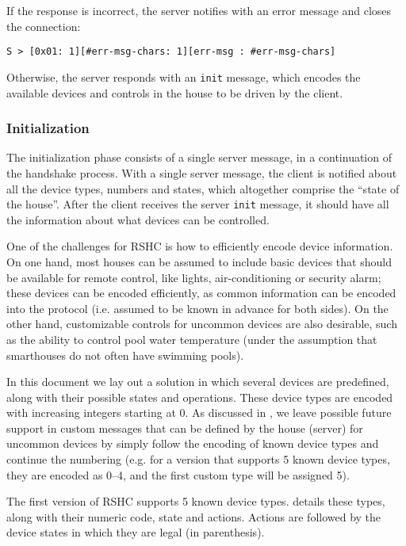\noindent
If the response is incorrect, the server notifies with an error message and closes the connection:
\begin{verbatim}
S > [0x01: 1][#err-msg-chars: 1][err-msg : #err-msg-chars]
\end{verbatim}

\noindent
Otherwise, the server responds with an {\tt init} message, which encodes the available devices and controls in the house to be driven by the client.

\subsubsection{Initialization}
\label{sec:pdus:pdu:init}

The initialization phase consists of a single server message, in a continuation of the handshake process. With a single server message, the client is notified about all the device types, numbers and states, which altogether comprise the ``state of the house''. After the client receives the server {\tt init} message, it should have all the information about what devices can be controlled.

One of the challenges for RSHC is how to efficiently encode device information. On one hand, most houses can be assumed to include basic devices that should be available for remote control, like lights, air-conditioning or security alarm; these devices can be encoded efficiently, as common information can be encoded into the protocol (i.e. assumed to be known in advance for both sides). On the other hand, customizable controls for uncommon devices are also desirable, such as the ability to control pool water temperature (under the assumption that smarthouses do not often have swimming pools).

In this document we lay out a solution in which several devices are predefined, along with their possible states and operations. These device types are encoded with increasing integers starting at 0. As discussed in , we leave possible future support in custom messages that can be defined by the house (server) for uncommon devices by simply follow the encoding of known device types and continue the numbering (e.g. for a version that supports 5 known device types, they are encoded as 0--4, and the first custom type will be assigned 5).

The first version of RSHC supports 5 known device types.  details these types, along with their numeric code, state and actions. Actions are followed by the device states in which they are legal (in parenthesis).

